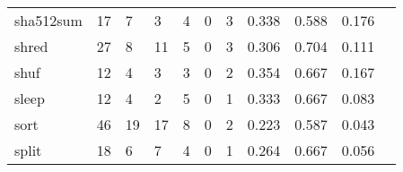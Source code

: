 \begin{longtable}{lp{1.2cm}p{1.2cm}p{1.2cm}p{1.2cm}p{1.2cm}p{1.2cm}p{1.2cm}p{1.2cm}p{1.2cm}p{1.2cm}}
sha512sum &                                    17 &                                                  7 &                                                  3 &                                                  4 &                                                  0 &                                                  3 &                                         0.338 &                                              0.588 &                                              0.176 \\
shred     &                                    27 &                                                  8 &                                                 11 &                                                  5 &                                                  0 &                                                  3 &                                         0.306 &                                              0.704 &                                              0.111 \\
shuf      &                                    12 &                                                  4 &                                                  3 &                                                  3 &                                                  0 &                                                  2 &                                         0.354 &                                              0.667 &                                              0.167 \\
sleep     &                                    12 &                                                  4 &                                                  2 &                                                  5 &                                                  0 &                                                  1 &                                         0.333 &                                              0.667 &                                              0.083 \\
sort      &                                    46 &                                                 19 &                                                 17 &                                                  8 &                                                  0 &                                                  2 &                                         0.223 &                                              0.587 &                                              0.043 \\
split     &                                    18 &                                                  6 &                                                  7 &                                                  4 &                                                  0 &                                                  1 &                                         0.264 &                                              0.667 &                                              0.056 \\

\end{longtable}

